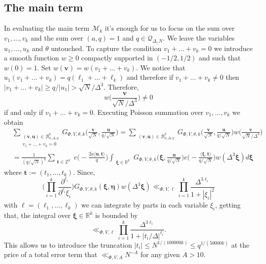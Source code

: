 \documentclass[12pt,reqno]{amsart}
\theoremstyle{plain}
\numberwithin{equation}{section}
\numberwithin{figure}{section}
\theoremstyle{plain}
\theoremstyle{definition}
\theoremstyle{remark}
\begin{document}
\subsection{The main term}
In evaluating the main term $\mathcal{M}_k$ it's enough for us to focus on the sum over $v_1, \ldots, v_k$ and the sum over $(a,q) = 1$ and $q \in \mathcal{Q}_{\Delta, N}$. We leave the variables $u_1, \ldots, u_k$ and $\theta$ untouched. 
To capture the condition $v_1 + \ldots + v_k = 0$ we introduce a smooth function $w\geq 0$ compactly supported in $(-1/2, 1/2)$ 
and such that $w(0) = 1$. Set $w(\boldsymbol{v}) = w(v_1 + \ldots + v_k)$. We notice that $u_1 (v_1 + \ldots + v_k) = q (\ell_1 + \ldots + \ell_k)$ and therefore if $v_1 + \ldots + v_k \neq 0$ then $|v_1 + \ldots + v_k| \geq q / |u_1| > \sqrt{N} / \Delta^3$. 
Therefore, 
$$
w \Big ( \frac{\boldsymbol{v}}{\sqrt{N} / \Delta^3} \Big ) \neq 0
$$
if and only if $v_1 + \ldots + v_k = 0$.  
Executing Poisson summation over $v_1, \ldots, v_{k}$ we obtain
\begin{align*}
& \sum_{\substack{(\boldsymbol{v}, \boldsymbol{u}) \in \mathcal{B}_{a, \Delta, q}^{k} \\ v_1 + \ldots + v_k = 0}}  G_{\Phi, V, \theta, k} \Big ( \frac{\boldsymbol{v}}{\sqrt{N}}, \frac{\boldsymbol{u}}{q / \sqrt{N}} \Big ) = \sum_{\substack{(\boldsymbol{v}, \boldsymbol{u}) \in \mathcal{B}_{a, \Delta, q}^{k}}}  G_{\Phi, V, \theta, k} \Big ( \frac{\boldsymbol{v}}{\sqrt{N}}, \frac{\boldsymbol{u}}{q / \sqrt{N}} \Big ) w \Big (\frac{\boldsymbol{v}}{\sqrt{N} / \Delta^3} \Big ) \\ & = \frac{1}{(q / \sqrt{N})^{k}} \sum_{\substack{\boldsymbol{t} \in \mathbb{Z}^{k}}} e \Big ( - \frac{\overline{2a} \langle \boldsymbol{u}, \boldsymbol{t} \rangle }{q} \Big ) \int_{\substack{\boldsymbol{\xi} \in \mathbb{R}^{k}}} G_{\Phi, V, \theta, k} \Big ( \boldsymbol{\xi}, \frac{\boldsymbol{u}}{q / \sqrt{N}} \Big ) e \Big ( - \frac{\langle \boldsymbol{\xi}, \boldsymbol{t} \rangle}{q / \sqrt{N}} \Big ) w (\Delta^3 \boldsymbol{\xi} ) d \boldsymbol{\xi}
\end{align*}
where $\mathbf{t} := (t_1, \ldots, t_k)$. 
Since, 
$$\Big ( \prod_{i = 1}^{k} \frac{\partial^{\ell_i}}{\partial^{\ell_i} \xi_i} \Big ) G_{\Phi, V, \theta, k} ( \boldsymbol{\xi}, \boldsymbol{\eta} ) w(\Delta^3 \boldsymbol{\xi}) \ll_{\Phi, V, \boldsymbol{\ell}} \prod_{i = 1}^{k} \frac{\Delta^{3 \ell_i}}{1 + |\xi_i|^{2}}$$ with $\boldsymbol{\ell} = (\ell_1, \ldots, \ell_k)$ 
we can integrate by parts in each variable $\xi_i$, getting that, the integral over $\boldsymbol{\xi} \in \mathbb{R}^k$ is bounded by 
$$
\ll_{\Phi, V, \boldsymbol{\ell}} \prod_{i = 1}^k \frac{\Delta^{3 \ell_i}}{1 + |t_i / \Delta|^{\ell_i}}.
$$
This allows us to introduce the truncation $|t_i| \leq N^{1/(100000k)} \leq q^{1/(50000k)}$ at the price of
a total error term that $\ll_{\Phi, V, A} N^{-A}$ for any given $A > 10$. 
\end{document}
